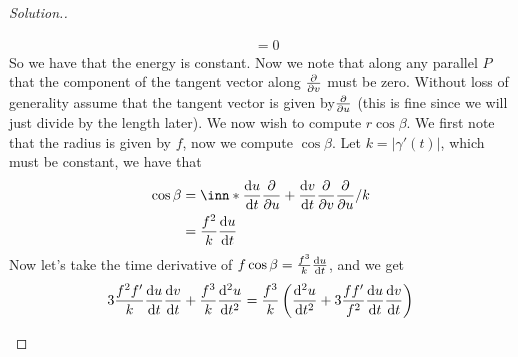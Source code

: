 \documentclass[a4paper]{article}
\begin{document}
\begin{proof}[Solution.]
\begin{enumerate}[a)]
\[\begin{aligned}
                                                    &= 0
        \end{aligned}
      \]
      So we have that the energy is constant. Now we note that along any parallel $P$ that the component of the tangent vector along $\pdv{v}$ must be zero. Without loss of generality assume that the tangent vector is given by$\pdv{u}$ (this is fine since we will just divide by the length later). We now wish to compute $r \cos \beta$. We first note that the radius is given by $f$, now we compute $\cos \beta$. Let $k = |\gamma'(t)|$, which must be constant, we have that
      \[
        \begin{aligned}
          \cos \beta &=  \inn*{\dv{u}{t} \pdv{u} + \dv{v}{t} \pdv{v}}{\pdv{u}}/ k\\
                     &=  \frac{f^2}{k} \dv{u}{t}
        \end{aligned}
      \]
      Now let's take the time derivative of $f \cos \beta = \frac{f^3}{k} \dv{u}{t}$, and we get
      \[
        \begin{aligned}
          3\frac{f^2f'}{k}\dv{u}{t}\dv{v}{t} + \frac{f^3}{k} \dv[2]{u}{t} = \frac{f^3}{k} \left(\dv[2]{u}{t} + 3\frac{ff'}{f^2}\dv{u}{t}\dv{v}{t}\right)
        \end{aligned}
      \]
  \end{enumerate}
\end{proof}
\end{document}
